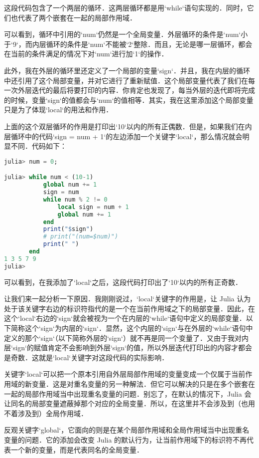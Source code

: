 这段代码包含了一个两层的循环．这两层循环都是用`while`语句实现的．同时，它们也代表了两个嵌套在一起的局部作用域．

可以看到，循环中引用的`num`仍然是一个全局变量．外层循环的条件是`num`小于`9`，而内层循环的条件是`num`不能被`2`整除．而且，无论是哪一层循环，都会在当前的条件满足的情况下对`num`进行加`1`的操作．

此外，我在外层的循环里还定义了一个局部的变量`sign`．并且，我在内层的循环中还引用了这个局部变量，并对它进行了重新赋值．这个局部变量代表了我们在每一次外层迭代的最后将要打印的内容．你肯定也发现了，每当外层的迭代即将完成的时候，变量`sign`的值都会与`num`的值相等．其实，我在这里添加这个局部变量只是为了体现`local`的用法和作用．

上面的这个双层循环的作用是打印出`10`以内的所有正偶数．但是，如果我们在内层循环中的代码`sign = num + 1`的左边添加一个关键字`local`，那么情况就会明显不同．代码如下：

\begin{lstlisting}[language=julia]
julia> num = 0;

julia> while num < (10-1) 
           global num += 1
           sign = num
           while num % 2 != 0
               local sign = num + 1
               global num += 1
           end
           print("$sign")
           # print("(num=$num)")
           print(" ")
       end
1 3 5 7 9 
julia> 
\end{lstlisting}

可以看到，在我添加了`local`之后，这段代码打印出了`10`以内的所有正奇数．

让我们来一起分析一下原因．我刚刚说过，`local`关键字的作用是，让 Julia 认为处于该关键字右边的标识符指代的是一个在当前作用域之下的局部变量．因此，在这个`local`右边的`sign`就会被视为一个在内层的`while`语句中定义的局部变量．以下简称这个`sign`为内层的`sign`．显然，这个内层的`sign`与在外层的`while`语句中定义的那个`sign`（以下简称外层的`sign`）就不再是同一个变量了．又由于我对内层`sign`的赋值肯定不会影响到外层`sign`的值，所以外层迭代打印出的内容才都会是奇数．这就是`local`关键字对这段代码的实际影响．

关键字`local`可以把一个原本引用自外层局部作用域的变量变成一个仅属于当前作用域的新变量．这是对重名变量的另一种解法．但它可以解决的只是在多个嵌套在一起的局部作用域当中出现重名变量的问题．别忘了，在默认的情况下，Julia 会让同名的局部变量遮蔽掉那个对应的全局变量．所以，在这里并不会涉及到（也用不着涉及到）全局作用域．

反观关键字`global`，它面向的则是在某个局部作用域和全局作用域当中出现重名变量的问题．它的添加会改变 Julia 的默认行为，让当前作用域下的标识符不再代表一个新的变量，而是代表同名的全局变量．

